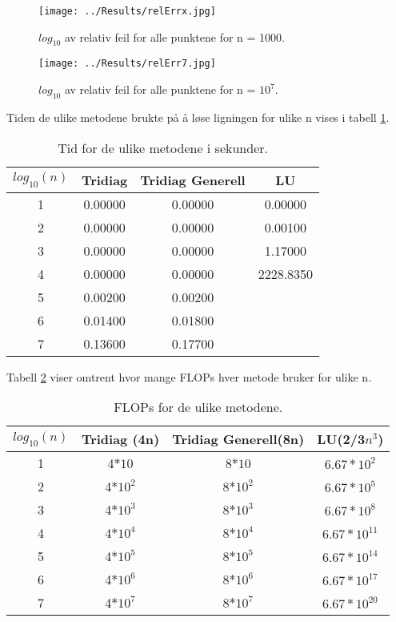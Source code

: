 \documentclass[reprint,english,notitlepage]{revtex4-1}
\begin{document}
	\begin{figure}[H]
		\texttt{[image: ../Results/relErrx.jpg]}
		\caption{$log_{10}$ av relativ feil for alle punktene for n = 1000.}
		\label{fig:relErr3}
	\end{figure}

	\begin{figure}[H]
		\texttt{[image: ../Results/relErr7.jpg]}
		\caption{$log_{10}$ av relativ feil for alle punktene for n = $10^7$.}
		\label{fig:relErr7}
	\end{figure}

	Tiden de ulike metodene brukte på å løse ligningen for ulike n vises i tabell \ref{tab:tid}. 
	
	\begin{table}[H]
		\begin{center}
			\caption{Tid for de ulike metodene i sekunder.}
			\label{tab:tid}
			\begin{tabular}{|c|c|c|c|} \hline
				\textbf{$log_{10}(n)$} & \textbf{Tridiag} & \textbf{Tridiag Generell} & \textbf{LU} \\ \hline
				1 & 0.00000 & 0.00000 & 0.00000 \\
				2 & 0.00000 & 0.00000 & 0.00100 \\
				3 & 0.00000 & 0.00000 & 1.17000 \\
				4 & 0.00000 & 0.00000 & 2228.8350 \\
				5 & 0.00200 & 0.00200 & \\
				6 & 0.01400 & 0.01800 & \\
				7 & 0.13600 & 0.17700 & \\ \hline
			\end{tabular}
		\end{center}
	\end{table}
	Tabell \ref{tab:flops} viser omtrent hvor mange FLOPs hver metode bruker for ulike n.
	\begin{table}[H]
		\begin{center}
			\caption{FLOPs for de ulike metodene.}
			\label{tab:flops}
			\begin{tabular}{|c|c|c|c|} \hline
				\textbf{$log_{10}(n)$} & \textbf{Tridiag (4n)} & \textbf{Tridiag Generell(8n)} & \textbf{LU(2/3$n^3$)} \\ \hline
				1 & 4$*10$ & 8$*10$ & $6.67*10^{2}$ \\
				2 & 4$*10^2$ & 8$*10^{2}$ & $6.67*10^{5}$ \\
				3 & 4$*10^3$ & 8$*10^{3}$ & $6.67*10^{8}$ \\
				4 & 4$*10^4$ & 8$*10^{4}$ & $6.67*10^{11}$ \\
				5 & 4$*10^5$ & 8$*10^{5}$ & $6.67*10^{14}$\\
				6 & 4$*10^6$ & 8$*10^{6}$ & $6.67*10^{17}$\\
				7 & 4$*10^7$ & 8$*10^{7}$ & $6.67*10^{20}$\\ \hline
			\end{tabular}
		\end{center}
	\end{table}
\end{document}
